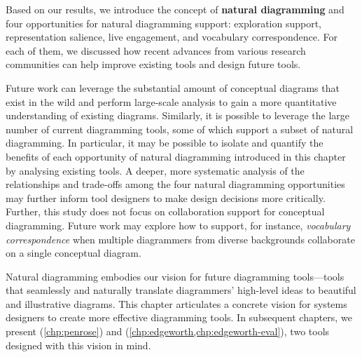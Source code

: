 Based on our results, we introduce the concept of \textbf{natural diagramming} and four opportunities for natural diagramming support: exploration support, representation salience, live engagement, and vocabulary correspondence. For each of them, we discussed how recent advances from various research communities can help improve existing tools and design future tools.

Future work can leverage the substantial amount of conceptual diagrams that exist in the wild and perform large-scale analysis to gain a more quantitative understanding of existing diagrams. Similarly, it is possible to leverage the large number of current diagramming tools, some of which support a subset of natural diagramming. In particular, it may be possible to isolate and quantify the benefits of each opportunity of natural diagramming introduced in this chapter by analysing existing tools. A deeper, more systematic analysis of the relationships and trade-offs among the four natural diagramming opportunities may further inform tool designers to make design decisions more critically. Further, this study does not focus on collaboration support for conceptual diagramming. Future work may explore how to support, for instance, \textit{vocabulary correspondence} when multiple diagrammers from diverse backgrounds collaborate on a single conceptual diagram. 

Natural diagramming embodies our vision for future diagramming tools---tools that seamlessly and naturally translate diagrammers' high-level ideas to beautiful and illustrative diagrams. This chapter articulates a concrete vision for systems designers to create more effective diagramming tools. In subsequent chapters, we present \Penrose{} (\cref{chp:penrose}) and \Edgeworth{} (\cref{chp:edgeworth,chp:edgeworth-eval}), two tools designed with this vision in mind.
